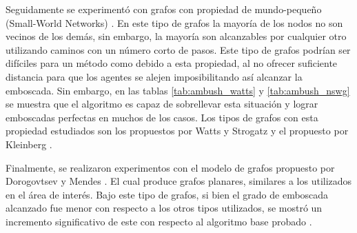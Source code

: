 Seguidamente se experiment\'o con grafos con propiedad de mundo-pequeño
(Small-World Networks) \cite{WS98}. En este tipo de grafos
la mayor\'ia de los nodos no son vecinos de los dem\'as, sin embargo,
la mayor\'ia son alcanzables por cualquier otro utilizando caminos con
un n\'umero corto de pasos. Este tipo de grafos podr\'ian ser dif\'iciles
para un m\'etodo como \ambush debido a esta propiedad, al no ofrecer suficiente
distancia para que los agentes se alejen imposibilitando as\'i alcanzar la
emboscada. Sin embargo, en las tablas \ref{tab:ambush_watts} y \ref{tab:ambush_nswg}
se muestra que el algoritmo es capaz de sobrellevar esta situaci\'on y lograr
emboscadas perfectas en muchos de los casos. Los tipos de grafos con esta
propiedad estudiados son los propuestos por Watts y Strogatz \cite{WS98}
y el propuesto por Kleinberg \cite{Kle00}.



Finalmente, se realizaron experimentos con el modelo de grafos propuesto
por Dorogovtsev y Mendes \cite{DM02}. El cual produce grafos planares,
similares a los utilizados en el \'area de inter\'es. Bajo este tipo
de grafos, si bien el grado de emboscada alcanzado fue menor con respecto
a los otros tipos utilizados, se mostr\'o un incremento significativo
de este con respecto al algoritmo base probado \astar.